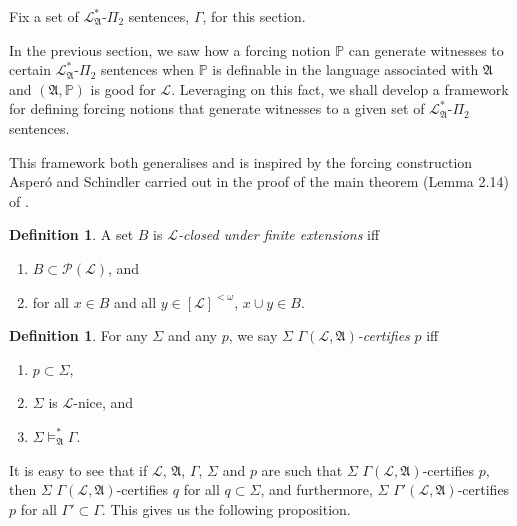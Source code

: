 \documentclass[12pt, twoside]{memoir}
\numberwithin{equation}{section}
\theoremstyle{definition}
\newtheorem{defi}[thm]{Definition}
\theoremstyle{remark}
\theoremstyle{definition}
\theoremstyle{definition}
\theoremstyle{definition}
\theoremstyle{remark}
\begin{document}
Fix a set of $\mathcal{L}^*_{\mathfrak{A}}$-$\Pi_2$ sentences, $\Gamma$, for this section.

In the previous section, we saw how a forcing notion $\mathbb{P}$ can generate witnesses to certain $\mathcal{L}^*_{\mathfrak{A}}$-$\Pi_2$ sentences when $\mathbb{P}$ is definable in the language associated with $\mathfrak{A}$ and $(\mathfrak{A}, \mathbb{P})$ is good for $\mathcal{L}$. Leveraging on this fact, we shall develop a framework for defining forcing notions that generate witnesses to a given set of $\mathcal{L}^*_{\mathfrak{A}}$-$\Pi_2$ sentences. 

This framework both generalises and is inspired by the forcing construction Asper\'{o} and Schindler carried out in the proof of the main theorem (Lemma 2.14) of \cite{schindler}.

\begin{defi}
A set $B$ is $\mathcal{L}$\emph{-closed under finite extensions} iff
\begin{enumerate}[label=(\alph*)]
    \item $B \subset \mathcal{P}(\mathcal{L})$, and
    \item for all $x \in B$ and all $y \in [\mathcal{L}]^{< \omega}$, $x \cup y \in B$.
\end{enumerate}
\end{defi}

\begin{defi}
For any $\Sigma$ and any $p$, we say $\Sigma$ $\Gamma(\mathcal{L}, \mathfrak{A})$\emph{-certifies} $p$ iff 
\begin{enumerate}[label=(\alph*)]
    \item $p \subset \Sigma$,
    \item $\Sigma$ is $\mathcal{L}$-nice, and
    \item $\Sigma \models^*_{\mathfrak{A}} \Gamma$.
\end{enumerate}
\end{defi}

It is easy to see that if $\mathcal{L}$, $\mathfrak{A}$, $\Gamma$, $\Sigma$ and $p$ are such that $\Sigma$ $\Gamma(\mathcal{L}, \mathfrak{A})$-certifies $p$, then $\Sigma$ $\Gamma(\mathcal{L}, \mathfrak{A})$-certifies $q$ for all $q \subset \Sigma$, and furthermore, $\Sigma$ $\Gamma'(\mathcal{L}, \mathfrak{A})$-certifies $p$ for all $\Gamma' \subset \Gamma$. This gives us the following proposition.
\end{document}
